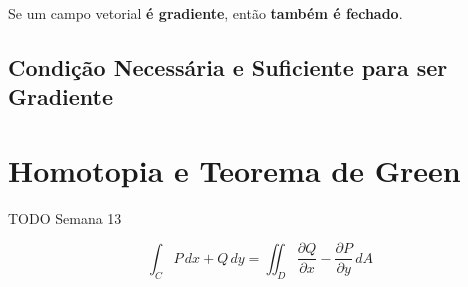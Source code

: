 \documentclass[11pt, a4paper]{article}
\begin{document}
Se um campo vetorial \textbf{é gradiente}, então \textbf{também é fechado}.

\subsection{Condição Necessária e Suficiente para ser Gradiente}

\section{Homotopia e Teorema de Green}

TODO Semana 13

\begin{equation*}
    \int_{C} P \, dx + Q \, dy =
    \iint_{D} \frac{\partial Q}{\partial x} - \frac{\partial P}{\partial y} \, dA
\end{equation*}
\end{document}
